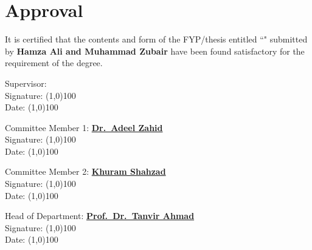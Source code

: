 \chapter*{Approval}
It is certified that the contents and form of the FYP/thesis entitled ``\textbf{\fyptitle}" submitted by \textbf{Hamza Ali and Muhammad Zubair} have been found satisfactory for the requirement of the degree.

\vspace*{10pt}\noindent
Supervisor: \textbf{\underline{\fypsupervisor}}\vspace*{10pt}\noindent\\
Signature: \line(1,0){100}\vspace*{10pt}\noindent\\
\vspace*{10pt}\noindent
Date:  \line(1,0){100}


\begin{flushright}
Committee Member 1: \textbf{\underline{Dr.\ Adeel Zahid}}\\
\vspace*{10pt}\noindent
Signature: \line(1,0){100}\\
\vspace*{10pt}\noindent
Date:  \line(1,0){100}


Committee Member 2: \textbf{\underline{Khuram Shahzad}}\\
\vspace*{10pt}\noindent
Signature: \line(1,0){100}\\
\vspace*{10pt}\noindent
Date:  \line(1,0){100}


Head of Department: \textbf{\underline{Prof.\ Dr.\ Tanvir Ahmad}}\\
\vspace*{10pt}\noindent
Signature: \line(1,0){100}\\
\vspace*{10pt}\noindent
Date:  \line(1,0){100}
\end{flushright}
